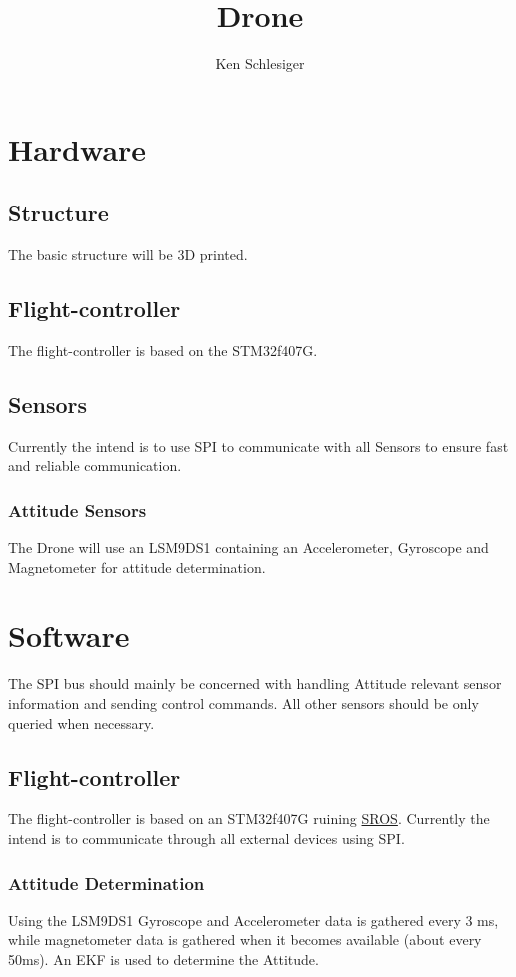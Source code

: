 \documentclass[10pt,a4paper]{article}
\title {Drone}
\author {Ken Schlesiger}
\begin{document}
\maketitle
\newpage
\section*{Hardware}
\label{sec:hardware}

\subsection*{Structure}
\label{structure}
The basic structure will be 3D printed. %

\subsection*{Flight-controller}
The flight-controller is based on the STM32f407G. 

\subsection*{Sensors}
Currently the intend is to use SPI to communicate with all Sensors to ensure fast and reliable communication.

\subsubsection*{Attitude Sensors}
The Drone will use an LSM9DS1 containing an Accelerometer, Gyroscope and Magnetometer for attitude determination.

\section*{Software}
\label{sec:software}
The SPI bus should mainly be concerned with handling Attitude relevant sensor information and sending control commands.
All other sensors should be only queried when necessary.

\subsection*{Flight-controller}
The flight-controller is based on an STM32f407G ruining \href{https://github.com/kenscl/SROS}{SROS}.
Currently the intend is to communicate through all external devices using SPI.

\subsubsection*{Attitude Determination}
Using the LSM9DS1 Gyroscope and Accelerometer data is gathered every 3 ms, while magnetometer data is gathered when it becomes available (about every 50ms).
An EKF %
is used to determine the Attitude. 
\end{document}
